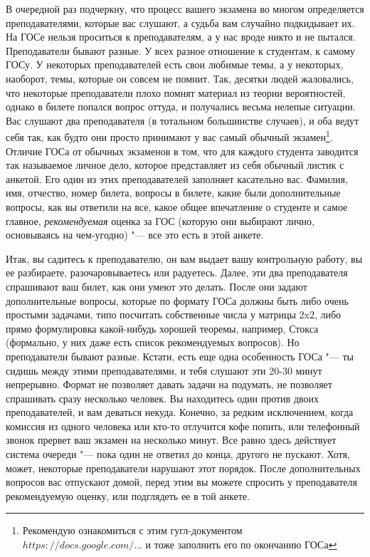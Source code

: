 В очередной раз подчеркну, что процесс вашего экзамена во многом определяется преподавателями, которые вас слушают, а судьба вам случайно подкидывает их. На ГОСе нельзя проситься к преподавателям, а у нас вроде никто и не пытался. Преподаватели бывают разные. У всех разное отношение к студентам, к самому ГОСу. У некоторых преподавателей есть свои любимые темы, а у некоторых, наоборот, темы, которые он совсем не помнит. Так, десятки людей жаловались, что некоторые преподаватели плохо помнят материал из теории вероятностей, однако в билете попался вопрос оттуда, и получались весьма нелепые ситуации. Вас слушают два преподавателя (в тотальном большинстве случаев), и оба ведут себя так, как будто они просто принимают у вас самый обычный экзамен\footnote{Рекомендую ознакомиться с этим гугл-документом \href{https://docs.google.com/spreadsheets/d/10jIg9Nr5oM1-Zjo_iIlKs8uxrBKrzfuJNas_YJIIxPs/edit\#gid=0}{$https://docs.google.com/...$} и тоже заполнить его по окончанию ГОСа}. Отличие ГОСа от обычных экзаменов в том, что для каждого студента заводится так называемое личное дело, которое представляет из себя обычный листик с анкетой. Его один из этих преподавателей заполняет касательно вас. Фамилия, имя, отчество, номер билета, вопросы в билете, какие были дополнительные вопросы, как вы ответили на все, какое общее впечатление о студенте и самое главное, \textit{рекомендуемая} оценка за ГОС (которую они выбирают лично, основываясь на чем-угодно) "--- все это есть в этой анкете. 

Итак, вы садитесь к преподавателю, он вам выдает вашу контрольную работу, вы ее разбираете, разочаровываетесь или радуетесь. Далее, эти два преподавателя спрашивают ваш билет, как они умеют это делать. После они задают дополнительные вопросы, которые по формату ГОСа должны быть либо очень простыми задачами, типо посчитать собственные числа у матрицы 2x2, либо прямо формулировка какой-нибудь хорошей теоремы, например, Стокса (формально, у них даже есть список рекомендуемых вопросов). Но преподаватели бывают разные. Кстати, есть еще одна особенность ГОСа "--- ты сидишь между этими преподавателями, и тебя слушают эти 20-30 минут непрерывно. Формат не позволяет давать задачи на подумать, не позволяет спрашивать сразу несколько человек. Вы находитесь один против двоих преподавателей, и вам деваться некуда. Конечно, за редким исключением, когда комиссия из одного человека или кто-то отлучится кофе попить, или телефонный звонок прервет ваш экзамен на несколько минут. Все равно здесь действует система очереди "--- пока один не ответил до конца, другого не пускают. Хотя, может, некоторые преподаватели нарушают этот порядок. После дополнительных вопросов вас отпускают домой, перед этим вы можете спросить у преподавателя рекомендуемую оценку, или подглядеть ее в той анкете.

